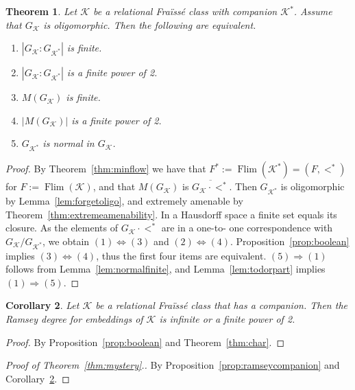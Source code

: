 \documentclass[12pt]{amsart}
\theoremstyle{plain}
\newtheorem{theorem}{Theorem}[section]
\newtheorem{corollary}[theorem]{Corollary}
\theoremstyle{definition}
\begin{document}
\begin{theorem}\label{prop:power2}
Let ${\mathcal K}$ be a relational Fra\"iss\'e class with companion ${\mathcal K}^*$. Assume that $G_{\mathcal K}$ is oligomorphic.
Then the following are equivalent.
\begin{enumerate}
\item $|G_{\mathcal K}:G_{{\mathcal K}^*}|$ is finite.
\item $|G_{\mathcal K}:G_{{\mathcal K}^*}|$ is a finite power of 2.
\item $M(G_{\mathcal K})$ is finite.
\item $|M(G_{\mathcal K})|$ is a finite power of 2.
\item $G_{{\mathcal K}^*}$ is normal in $G_{\mathcal K}$.
\end{enumerate}
\end{theorem}
 
\begin{proof} 
By Theorem~\ref{thm:minflow} we have that $F^*:=\operatorname{Flim}({\mathcal K}^*)=(F,<^*)$ for $F:=\operatorname{Flim}({\mathcal K})$, and that
$M(G_{\mathcal K})$ is $\overline{G_{\mathcal K}\cdot <^*}$. Then $G_{{\mathcal K}^*}$ 
is oligomorphic by Lemma~\ref{lem:forgetoligo}, and extremely amenable by
Theorem~\ref{thm:extremeamenability}.
In a Hausdorff space a finite set equals its closure.
As the elements of $G_{\mathcal K}\cdot <^*$ are in a one-to-
one correspondence with $G_{\mathcal K}/G_{{\mathcal K}^*}$, we obtain $(1)\Leftrightarrow(3)$ and $(2)\Leftrightarrow(4)$. 
Proposition~\ref{prop:boolean} implies $(3)\Leftrightarrow(4)$, thus the first four items are equivalent. $(5)\Rightarrow(1)$ 
follows from Lemma~\ref{lem:normalfinite}, and Lemma~\ref{lem:todorpart} implies $(1)\Rightarrow(5)$.
\end{proof}

\begin{corollary}\label{cor:mystery2}
 Let ${\mathcal K}$ be a relational Fra\"iss\'e class that has a companion. Then the 
Ramsey degree for embeddings of ${\mathcal K}$ is infinite or a finite power of 2.
\end{corollary}

\begin{proof} 
By  Proposition~\ref{prop:boolean} and Theorem~\ref{thm:char}.
\end{proof}

\begin{proof}[Proof of Theorem~\ref{thm:mystery}.] By Proposition~\ref{prop:ramseycompanion} and Corollary~\ref{cor:mystery2}.
\end{proof}
\end{document}
